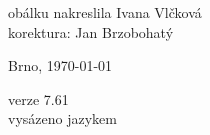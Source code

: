 \vspace*{\fill}
\hspace{10mm}obálku nakreslila Ivana Vlčková\\
korektura: Jan Brzobohatý\\
\begin{otherlanguage}{czech}
Brno, \today\\
\end{otherlanguage}
verze 7.61\\
vysázeno jazykem \LaTeXe
\vspace{2cm}
\newpage
